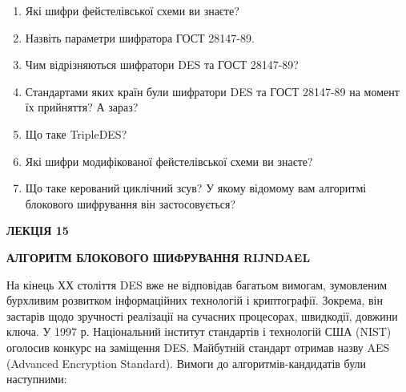 \liststyleWWviiiNuml
\begin{enumerate}
\item Які шифри фейстелівської схеми ви знаєте?
\item Назвіть параметри шифратора ГОСТ 28147-89.
\item Чим відрізняються шифратори DES та ГОСТ 28147-89?
\item Стандартами яких країн були шифратори DES та ГОСТ 28147-89 на момент їх
прийняття? А зараз?
\item Що таке TripleDES?
\item Які шифри модифікованої фейстелівської схеми ви знаєте?
\item Що таке керований циклічний зсув? У якому відомому вам алгоритмі блокового
шифрування він застосовується?
\end{enumerate}

\bigskip


\bigskip


\bigskip

{\bfseries
ЛЕКЦІЯ  15}


\bigskip

{\centering\bfseries
АЛГОРИТМ  БЛОКОВОГО  ШИФРУВАННЯ  RIJNDAEL
\par}


\bigskip


\bigskip

На кінець ХХ століття DES вже не відповідав багатьом вимогам, зумовленим
бурхливим розвитком інформаційних технологій і криптографії. Зокрема, він
застарів щодо зручності реалізації на сучасних процесорах, швидкодії, довжини
ключа. У 1997 р. Національний інститут стандартів і технологій США (NIST)
оголосив конкурс на заміщення DES. Майбутній стандарт отримав назву AES
(Advanced Encryption Standard). Вимоги до алгоритмів-кандидатів були
наступними:

